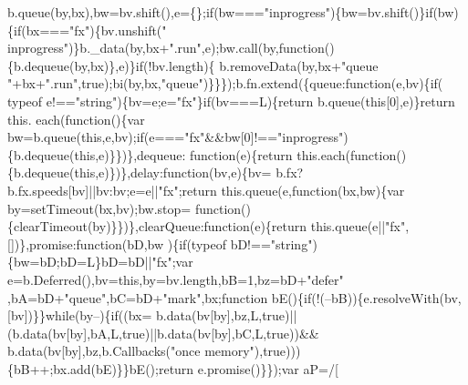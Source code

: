 \begin{DoxyCode}
      b.queue(by,bx),bw=bv.shift(),e=\{\};\textcolor{keywordflow}{if}(bw===\textcolor{stringliteral}{"inprogress"})\{bw=bv.shift()\}\textcolor{keywordflow}{if}(bw)\{\textcolor{keywordflow}{if}(bx===\textcolor{stringliteral}{"fx"})\{bv.unshift(\textcolor{stringliteral}{"
      inprogress"})\}b.\_data(by,bx+\textcolor{stringliteral}{".run"},e);bw.call(by,\textcolor{keyword}{function}()\{b.dequeue(by,bx)\},e)\}\textcolor{keywordflow}{if}(!bv.length)\{
      b.removeData(by,bx+\textcolor{stringliteral}{"queue "}+bx+\textcolor{stringliteral}{".run"},\textcolor{keyword}{true});bi(by,bx,\textcolor{stringliteral}{"queue"})\}\}\});b.fn.extend(\{queue:\textcolor{keyword}{function}(e,bv)\{\textcolor{keywordflow}{if}(
      typeof e!==\textcolor{stringliteral}{"string"})\{bv=e;e=\textcolor{stringliteral}{"fx"}\}\textcolor{keywordflow}{if}(bv===L)\{\textcolor{keywordflow}{return} b.queue(\textcolor{keyword}{this}[0],e)\}\textcolor{keywordflow}{return} this.
      each(\textcolor{keyword}{function}()\{var bw=b.queue(\textcolor{keyword}{this},e,bv);\textcolor{keywordflow}{if}(e===\textcolor{stringliteral}{"fx"}&&bw[0]!==\textcolor{stringliteral}{"inprogress"})\{b.dequeue(\textcolor{keyword}{this},e)\}\})\},dequeue:\textcolor{keyword}{
      function}(e)\{\textcolor{keywordflow}{return} this.each(\textcolor{keyword}{function}()\{b.dequeue(\textcolor{keyword}{this},e)\})\},delay:\textcolor{keyword}{function}(bv,e)\{bv=
      b.fx?b.fx.speeds[bv]||bv:bv;e=e||\textcolor{stringliteral}{"fx"};\textcolor{keywordflow}{return} this.queue(e,\textcolor{keyword}{function}(bx,bw)\{var by=setTimeout(bx,bv);bw.stop=\textcolor{keyword}{
      function}()\{clearTimeout(by)\}\})\},clearQueue:\textcolor{keyword}{function}(e)\{\textcolor{keywordflow}{return} this.queue(e||\textcolor{stringliteral}{"fx"},[])\},promise:\textcolor{keyword}{function}(bD,bw
      )\{\textcolor{keywordflow}{if}(typeof bD!==\textcolor{stringliteral}{"string"})\{bw=bD;bD=L\}bD=bD||\textcolor{stringliteral}{"fx"};var e=b.Deferred(),bv=\textcolor{keyword}{this},by=bv.length,bB=1,bz=bD+\textcolor{stringliteral}{"defer"}
      ,bA=bD+\textcolor{stringliteral}{"queue"},bC=bD+\textcolor{stringliteral}{"mark"},bx;\textcolor{keyword}{function} bE()\{\textcolor{keywordflow}{if}(!(--bB))\{e.resolveWith(bv,[bv])\}\}\textcolor{keywordflow}{while}(by--)\{\textcolor{keywordflow}{if}((bx=
      b.data(bv[by],bz,L,\textcolor{keyword}{true})||(b.data(bv[by],bA,L,\textcolor{keyword}{true})||b.data(bv[by],bC,L,\textcolor{keyword}{true}))&&
      b.data(bv[by],bz,b.Callbacks(\textcolor{stringliteral}{"once memory"}),\textcolor{keyword}{true})))\{bB++;bx.add(bE)\}\}bE();\textcolor{keywordflow}{return} e.promise()\}\});var aP=/[

\end{DoxyCode}
